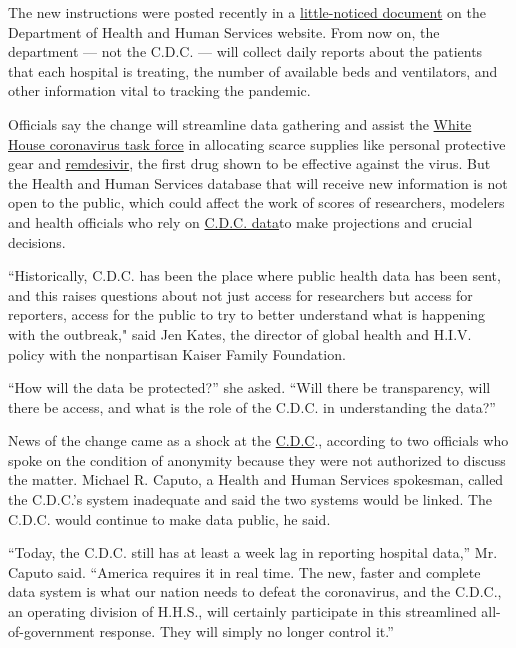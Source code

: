The new instructions were posted recently in a
\href{https://www.hhs.gov/sites/default/files/covid-19-faqs-hospitals-hospital-laboratory-acute-care-facility-data-reporting.pdf}{little-noticed
document} on the Department of Health and Human Services website. From
now on, the department --- not the C.D.C. --- will collect daily reports
about the patients that each hospital is treating, the number of
available beds and ventilators, and other information vital to tracking
the pandemic.

Officials say the change will streamline data gathering and assist the
\href{https://www.nytimes3xbfgragh.onion/2020/07/18/us/politics/trump-coronavirus-response-failure-leadership.html}{White
House coronavirus task force} in allocating scarce supplies like
personal protective gear and
\href{https://www.nytimes3xbfgragh.onion/2020/06/29/health/coronavirus-remdesivir-gilead.html}{remdesivir},
the first drug shown to be effective against the virus. But the Health
and Human Services database that will receive new information is not
open to the public, which could affect the work of scores of
researchers, modelers and health officials who rely on
\href{https://www.cdc.gov/nhsn/covid19/report-patient-impact.html}{C.D.C.
data}to make projections and crucial decisions.

``Historically, C.D.C. has been the place where public health data has
been sent, and this raises questions about not just access for
researchers but access for reporters, access for the public to try to
better understand what is happening with the outbreak," said Jen Kates,
the director of global health and H.I.V. policy with the nonpartisan
Kaiser Family Foundation.

``How will the data be protected?'' she asked. ``Will there be
transparency, will there be access, and what is the role of the C.D.C.
in understanding the data?''

News of the change came as a shock at the
\href{https://www.nytimes3xbfgragh.onion/2020/07/24/health/cdc-schools-coronavirus.html}{C.D.C}.,
according to two officials who spoke on the condition of anonymity
because they were not authorized to discuss the matter. Michael R.
Caputo, a Health and Human Services spokesman, called the C.D.C.'s
system inadequate and said the two systems would be linked. The C.D.C.
would continue to make data public, he said.

``Today, the C.D.C. still has at least a week lag in reporting hospital
data,'' Mr. Caputo said. ``America requires it in real time. The new,
faster and complete data system is what our nation needs to defeat the
coronavirus, and the C.D.C., an operating division of H.H.S., will
certainly participate in this streamlined all-of-government response.
They will simply no longer control it.''

